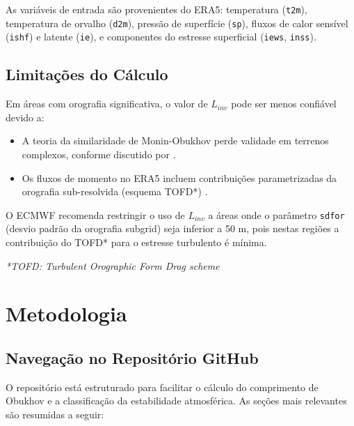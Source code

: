 \documentclass[12pt]{article}
\begin{document}
As variáveis de entrada são provenientes do ERA5: temperatura (\texttt{t2m}), temperatura de orvalho (\texttt{d2m}), pressão de superfície (\texttt{sp}), fluxos de calor sensível (\texttt{ishf}) e latente (\texttt{ie}), e componentes do estresse superficial (\texttt{iews}, \texttt{inss}).

\subsection{Limitações do Cálculo}
\label{subsec:limitacoes}

Em áreas com orografia significativa, o valor de $L_{inv}$ pode ser menos confiável devido a:
\begin{itemize}
    \item A teoria da similaridade de Monin-Obukhov perde validade em terrenos complexos, conforme discutido por \citep{stull1988}.
    \item Os fluxos de momento no ERA5 incluem contribuições parametrizadas da orografia sub-resolvida (esquema TOFD*) \citep{beljaars2004}.
\end{itemize}

O ECMWF recomenda restringir o uso de $L_{inv}$ a áreas onde o parâmetro \texttt{sdfor} (desvio padrão da orografia subgrid) seja inferior a 50 m, pois nestas regiões a contribuição do TOFD* para o estresse turbulento é mínima.

\textit{*TOFD: Turbulent Orographic Form Drag scheme}
\section{Metodologia}
\subsection{Navegação no Repositório GitHub}

O repositório está estruturado para facilitar o cálculo do comprimento de Obukhov e a classificação da estabilidade atmosférica. As seções mais relevantes são resumidas a seguir:
\end{document}

